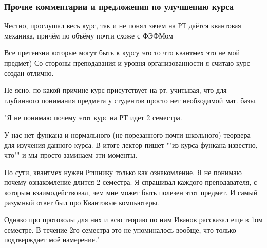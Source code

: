     \subsubsection{Прочие комментарии и предложения по улучшению курса}
        \begin{commentbox}
            Честно, прослушал весь курс, так и не понял зачем на РТ даётся квантовая механика, причём по объёму почти схоже с ФЭФМом 
        \end{commentbox}

        \begin{commentbox}
            Все претензии которые могут быть к курсу это то что квантмех это не мой предмет) Со стороны преподавания и уровня организованности я считаю курс создан отлично.
        \end{commentbox}

        \begin{commentbox}
            Не ясно, по какой причине курс присутствует на рт, учитывая, что для глубинного понимания предмета у студентов просто нет необходимой мат. базы.
        \end{commentbox}

        \begin{commentbox}
            "Я не понимаю почему этот курс на РТ идет 2 семестра. 

            У нас нет функана и нормального (не порезанного почти школьного) теорвера для изучения данного курса. В итоге лектор пишет ""из курса функана известно, что"" и мы просто заминаем эти моменты. 

            По сути, квантмех нужен Ртшнику только как ознакомление. Я не понимаю почему ознакомление длится 2 семестра. Я спрашивал каждого преподавателя, с которым взаимодействовал, чем мне может быть полезен этот предмет. И самый разумный ответ был про Квантовые компьютеры. 

            Однако про протоколы для них и всю теорию по ним Иванов рассказал еще в 1ом семестре. В течение 2го семестра это не упоминалось вообще, что только подтверждает моё намерение."
        \end{commentbox}